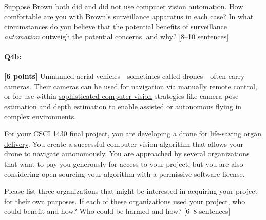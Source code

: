\begin{tcolorbox}[colback=orange!5!white,colframe=orange!75!black]
Suppose Brown both did and did not use computer vision automation. How comfortable are you with Brown's surveillance apparatus in each case?
In what circumstances do you believe that the potential benefits of surveillance \emph{automation} outweigh the potential concerns, and why? [8--10 sentences]
\end{tcolorbox}


\pagebreak
\paragraph{Q4b:} \textbf{[6 points]} Unmanned aerial vehicles---sometimes called drones---often carry cameras. Their cameras can be used for navigation via manually remote control, or for use within \href{https://link.springer.com/article/10.1007/s10846-017-0483-z}{sophisticated computer vision} strategies like camera pose estimation and depth estimation to enable assisted or autonomous flying in complex environments.

For your CSCI 1430 final project, you are developing a drone for \href{https://www.cnn.com/2019/05/01/health/drone-organ-transplant-bn-trnd/index.html}{life-saving organ delivery}. You create a successful computer vision algorithm that allows your drone to navigate autonomously. You are approached by several organizations that want to pay you generously for access to your project, but you are also considering open sourcing your algorithm with a permissive software license.

\begin{tcolorbox}[colback=orange!5!white,colframe=orange!75!black]
Please list three organizations that might be interested in acquiring your project for their own purposes. If each of these organizations used your project, who could benefit and how? Who could be harmed and how? [6--8 sentences]
\end{tcolorbox}


